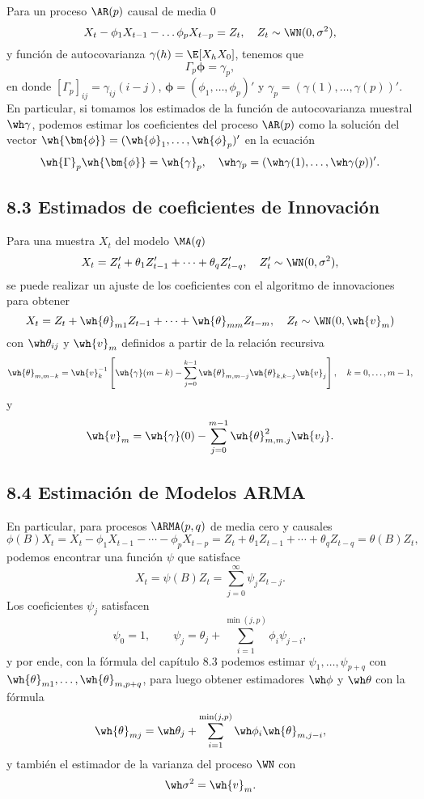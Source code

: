 Para un proceso $\AR(p)$ causal de media 0
\[ X_t -\phi_1 X_{t-1} - \ldots \phi_{p} X_{t-p} = Z_t,\quad Z_t \sim \WN(0,\sigma^2), \]
y función de autocovarianza $\gamma(h) = \E[X_h X_0]$, tenemos que
\[ \Gamma_p \bm{\phi} = \gamma_p, \]
en donde $[\Gamma_p]_{ij} = \gamma_{ij}(i-j)$, $\bm{\phi} = (\phi_1,\ldots, \phi_p)'$ y $\gamma_p = (\gamma(1),\ldots, \gamma(p))'$. En particular, si tomamos los estimados de la función de autocovarianza muestral $\wh\gamma$, podemos estimar los coeficientes del proceso $\AR(p)$ como la solución del vector $\wh{\bm{\phi}} = (\wh{\phi}_1,\ldots,\wh{\phi}_p)'$ en la ecuación
\[ \wh{\Gamma}_p \wh{\bm{\phi}} = \wh{\gamma}_p,\quad \wh\gamma_p = (\wh\gamma(1),\ldots, \wh\gamma(p))'. \]


\subsection*{8.3 Estimados de coeficientes de Innovación}

Para una muestra $X_t$ del modelo $\MA(q)$
\[ X_t = Z_t' + \theta_1 Z_{t-1}' + \cdots + \theta_q Z_{t-q}',\quad Z_t' \sim \WN(0,\sigma^2), \]
se puede realizar un ajuste de los coeficientes con el algoritmo de innovaciones para obtener
\[ X_t = Z_t + \wh{\theta}_{m1} Z_{t-1} + \cdots + \wh{\theta}_{mm} Z_{t-m},\quad Z_t \sim \WN(0,\wh{v}_m) \]
con $\wh\theta_{ij}$ y $\wh{v}_m$ definidos a partir de la relación recursiva
\[ \wh{\theta}_{m,m-k} = \wh{v}_k^{-1}\left[  \wh{\gamma}(m-k) - \sum_{j = 0}^{k-1} \wh{\theta}_{m,m-j} \wh{\theta}_{k,k-j} \wh{v}_j \right],\quad k = 0,\ldots, m-1, \]
y
\[ \wh{v}_m = \wh{\gamma}(0) - \sum_{j = 0}^{m-1} \wh{\theta}_{m,m.j}^2 \wh{v_j}. \]

\subsection*{8.4 Estimación de Modelos ARMA}

En particular, para procesos $\ARMA(p,q)$ de media cero y causales
\[ \phi(B)X_t = X_t - \phi_{1} X_{t-1} - \cdots - \phi_p X_{t-p} = Z_t + \theta_1 Z_{t-1} + \cdots + \theta_q Z_{t-q} = \theta(B) Z_t,  \]
podemos encontrar una función $\psi$ que satisface
\[ X_t = \psi(B) Z_t = \sum_{j = 0}^{\infty} \psi_j Z_{t-j}. \]
Los coeficientes $\psi_j$ satisfacen
\[ \psi_0 = 1,\quad\quad \psi_j = \theta_j + \sum_{i = 1}^{\min(j,p)} \phi_i \psi_{j-i}, \]
y por ende, con la fórmula del capítulo 8.3 podemos estimar $\psi_1,\ldots, \psi_{p+q}$ con $\wh{\theta}_{m1},\ldots, \wh{\theta}_{m,p+q}$, para luego obtener estimadores $\wh\phi$ y $\wh\theta$ con la fórmula
\[ \wh{\theta}_{mj} = \wh\theta_j + \sum_{i = 1}^{\min(j,p)} \wh\phi_i \wh{\theta}_{m,j-i}, \]
y también el estimador de la varianza del proceso $\WN$ con
\[ \wh\sigma^2 = \wh{v}_m. \]

